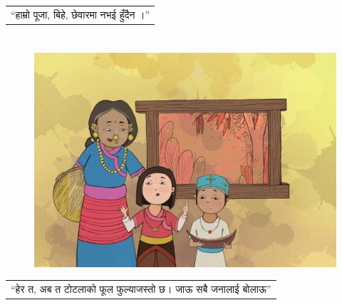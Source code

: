 \documentclass[
  letterpaper,
  DIV=11,
  numbers=noendperiod,
  paper=6in:9in,
  pagesize=pdftex,
  headinclude=on,
  footinclude=on,
  12pt]{scrreprt}
\begin{document}
\begin{longtable}[]{@{}l@{}}
\toprule\noalign{}
\endhead
\bottomrule\noalign{}
\endlastfoot
``हाम्रो पूजा, बिहे, छेवारमा नभई हुँदैन ।'' \\
\end{longtable}


\hypertarget{section-5}{%
\chapter{}\label{section-5}}

\begin{figure}[H]

{\centering \includegraphics{images/p-7.jpg}

}

\end{figure}

\begin{longtable}[]{@{}l@{}}
\toprule\noalign{}
\endhead
\bottomrule\noalign{}
\endlastfoot
``हेर त, अब त टोटलाको फूल फुल्‍याजस्तो छ। जाऊ सबै जनालाई बोलाऊ'' \\
\end{longtable}


\hypertarget{section-6}{%
\chapter{}\label{section-6}}
\end{document}
